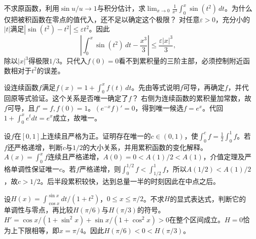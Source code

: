 \setlength{\parskip}{3.5pt}
不求原函数，利用\(\sin u/u\to1\)与积分估计，求\(\displaystyle\lim_{x\to0}\frac1{x^3}\int_0^x\sin(t^2)\,dt\)。为什么仅把被积函数在零点的值代入，还不足以确定这个极限？
\solutionanswer
对任意\(\varepsilon>0\)，充分小的\(|t|\)满足\(|\sin(t^2)-t^2|\le\varepsilon t^2\)。因此
\[
 \left|\int_0^x\sin(t^2)\,dt-\frac{x^3}3\right|\le\frac{\varepsilon|x|^3}3,
\]
除以\(|x|^3\)得极限\(1/3\)。只代入\(f(0)=0\)看不到累积量的三阶主部，必须控制附近函数相对于\(t^2\)的误差。


\setlength{\parskip}{3.5pt}
设连续函数\(f\)满足\(f(x)=1+\int_0^xf(t)\,dt\)。先由等式说明\(f\)可导，再确定\(f\)，并代回原等式验证。这个关系是否唯一确定了\(f\)？
\solutionanswer
右侧为连续函数的累积量加常数，故\(f\)可导，且\(f'=f,f(0)=1\)。\((e^{-x}f)'=0\)，得到唯一候选\(f=e^x\)。代回\(1+\int_0^xe^t dt=e^x\)成立，故唯一。


\setlength{\parskip}{3.5pt}
设\(f\)在\([0,1]\)上连续且严格为正。证明存在唯一的\(c\in(0,1)\)，使\(\int_0^cf=\tfrac12\int_0^1f\)。若\(f\)还严格递增，判断\(c\)与\(1/2\)的大小关系，并用累积函数的变化解释。
\solutionanswer
\(A(x)=\int_0^xf\)连续且严格递增，\(A(0)=0<A(1)/2<A(1)\)，介值定理及严格单调性保证唯一\(c\)。若\(f\)严格递增，则\(\int_0^{1/2}f<\int_{1/2}^1f\)，所以\(A(1/2)<A(1)/2\)，故\(c>1/2\)。后半段累积较快，达到总量一半的时刻因此在中点之后。


\setlength{\parskip}{3.5pt}
设\(H(x)=\int_{\cos x}^{\sin x}dt/(1+t^2)\)，\(0\le x\le\pi/2\)。不求\(H\)的显式表达式，判断它的单调性与零点，再比较\(H(\pi/6)\)与\(H(\pi/3)\)的符号。
\solutionanswer
\(H'=\cos x/(1+\sin^2x)+\sin x/(1+\cos^2x)>0\)在整个区间成立。\(H=0\)恰为上下限相等，即\(x=\pi/4\)。因此\(H(\pi/6)<0<H(\pi/3)\)。
\par
